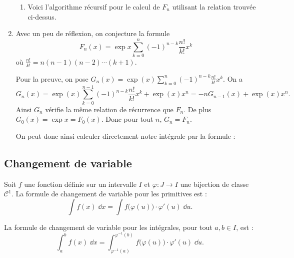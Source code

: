 \documentclass[class=report,crop=false]{standalone}
\begin{document}
\begin{enumerate}
\begin{enumerate}
    \item Voici l'algorithme récursif pour le calcul de $F_n$ utilisant 
    la relation trouvée ci-dessus.
    
    
  \end{enumerate} 
  
  \item Avec un peu de réflexion, on conjecture la formule 
  $$F_n(x) = \exp x \sum_{k=0}^n (-1)^{n-k} \frac{n!}{k!} x^k$$
  où $\frac{n!}{k!} =  n(n-1)(n-2)\cdots (k+1)$.
  
  Pour la preuve, on pose $G_n(x) = \exp(x)\sum_{k=0}^n (-1)^{n-k} \frac{n!}{k!} x^k$.
  On a 
  $$G_n(x) = \exp(x)\sum_{k=0}^{n-1} (-1)^{n-k} \frac{n!}{k!} x^k  + \exp(x)x^n
  = -n G_{n-1}(x)+ \exp(x)x^n.$$ 
  Ainsi 
  $G_n$ vérifie la même relation de récurrence que $F_n$.
  De plus $G_0(x)=\exp x = F_0(x)$. Donc pour tout $n$, $G_n=F_n$.
  
  On peut donc ainsi calculer directement notre intégrale par la formule : \\  
  \centerline{}
 
\end{enumerate}



\subsection{Changement de variable}

Soit $f$ une fonction définie sur un intervalle $I$ et $\varphi : J \to I$ 
une bijection de classe $\mathcal{C}^1$.
La formule de changement de variable pour les primitives est :
$$\int f(x) \; \dd x = \int f\big(\varphi(u)\big)\cdot\varphi'(u) \; \dd u.$$

La formule de changement de variable pour les intégrales, pour tout $a,b\in I$, est :
$$\int_a^b f(x) \; \dd x 
= \int_{\varphi^{-1}(a)}^{\varphi^{-1}(b)} f\big(\varphi(u)\big)\cdot\varphi'(u) \; \dd u.$$
\end{document}
